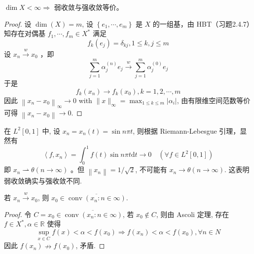 \documentclass[lang=cn,newtx,10pt,scheme=chinese,thmcnt=chapter]{elegantbook}
\newcommand{\dif}{\mathrm{d}}
\begin{document}
\begin{proposition}
$\operatorname{dim} X<\infty \Rightarrow$ 弱收敛与强收敛等价。

\end{proposition}
\begin{proof}
设 $\operatorname{dim}(X)=m$, 设 $\left\{e_1, \cdots, e_m\right\}$ 是 $X$ 的一组基，由 HBT（习题2.4.7）知存在对偶基 $f_1, \cdots, f_m \in X^*$ 满足
\begin{equation*}
f_k\left(e_j\right)=\delta_{k j}, 1 \leqslant k, j \leqslant m
\end{equation*}
设 $x_n \xrightarrow{w} x_0$ ，即
\begin{equation*}
\sum_{j=1}^m \alpha_j^{(n)} e_j \xrightarrow{w} \sum_{j=1}^m \alpha_j^{(0)} e_j
\end{equation*}
于是
\begin{equation*}
f_k\left(x_n\right) \rightarrow f_k\left(x_0\right), k=1,2, \cdots, m
\end{equation*}
因此 $\left\|x_n-x_0\right\|_{\infty} \rightarrow 0$ with $\|x\|_{\infty}=\max _{1 \leqslant k \leqslant m}\left|\alpha_i\right|$, 由有限维空间范数等价可得 $\left\|x_n-x_0\right\| \rightarrow 0$.
\end{proof}
\begin{example}[弱收敛而非强收敛]
 在 $L^2[0,1]$ 中, 设 $x_n=x_n(t)=\sin n \pi t$, 则根据 Riemann-Lebesgue 引理，显然有
\begin{equation*}
\left\langle f, x_n\right\rangle=\int_0^1 f(t) \sin n \pi t \dif t \rightarrow 0 \quad\left(\forall f \in L^2[0,1]\right)
\end{equation*}
即 $x_n \rightharpoonup \theta(n \rightarrow \infty)$ 。但 $\left\|x_n\right\|=1 / \sqrt{2}$, 不可能有 $x_n \rightarrow \theta(n \rightarrow \infty)$.
这表明弱收敛确实与强收敛不同. 
\end{example}
\begin{theorem}[Mazur]
若 $x_n \xrightarrow{w} x_0$, 则 $x_0 \in \overline{\operatorname{conv}\left(x_n: n \in \infty\right)}$.
\end{theorem}
\begin{proof}
令 $C=x_0 \in \overline{\operatorname{conv}\left(x_n: n \in \infty\right)}$, 若 $x_0 \notin C$, 则由 Ascoli 定理, 存在 $f \in X^*, \alpha \in \mathbb{R}$ 使得
\begin{equation*}
\sup _{x \in C} f(x)<\alpha<f\left(x_0\right) \Rightarrow f\left(x_n\right)<\alpha<f\left(x_0\right), \forall n \in N
\end{equation*}
因此 $f\left(x_n\right) \nrightarrow f\left(x_0\right)$, 矛盾.
\end{proof}
\end{document}
